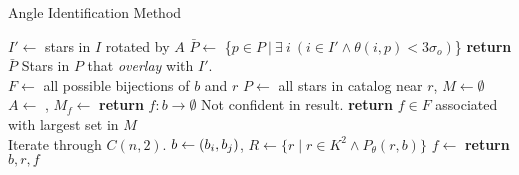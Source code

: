 \newcommand{\invalidBijection}{\If{$\forall \ \vv{b^\star}, \ \vv{b^\star} \in b \land f\left(\vv{b^\star}\right)
\neq \emptyset$}}
\begin{algorithm}[ht]
    \caption{Angle Identification Method} \label{algorithm:angleIdentification}
    \begin{algorithmic}[1]
        \State $I' \gets$ stars in $I$ rotated by $A$
        \State $\bar{P} \gets $ \{$p \in P \ | \ \exists \ i \ (i \in I' \land \theta (i, p) < 3\sigma_o)$\}
        \State \textbf{return} $\bar{P}$ \Comment Stars in $P$ that \textit{overlay} with $I'$.
        \EndFunction
        \\
        \State $F \gets $ all possible bijections of $b$ and $r$
        \State $P \gets $ all stars in catalog near $r$, $M \gets \emptyset$
        \State $A \gets $ , $M_f \gets $ 
        \EndFor
        \State \textbf{return} $f : b \rightarrow \emptyset $ \Comment Not confident in result.
        \Else
        \State \textbf{return} $f \in F$ associated with largest set in $M$
        \EndIf
        \EndFunction
        \\
         \Comment Iterate through $C(n, 2)$.
        \State $b \gets \left(b_i, b_j\right)$, $R \gets \{ r \mid r \in K^2 \land P_\theta(r, b) \}$
        \State $f \gets $  %
        \invalidBijection
        \State \textbf{return} $b, r, f$
        \EndIf
        \EndIf
        \EndFor
        \EndFor
        \EndFunction
    \end{algorithmic}
\end{algorithm}

